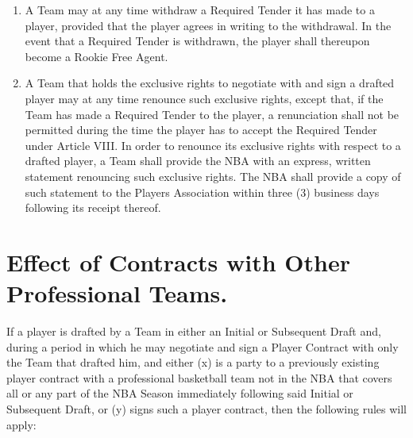 \documentclass[
]{book}
\begin{document}
\begin{enumerate}
\item
  A Team may at any time withdraw a Required Tender it has made to a player, provided that the player agrees in writing to the withdrawal. In the event that a Required Tender is withdrawn, the player shall thereupon become a Rookie Free Agent.
\item
  A Team that holds the exclusive rights to negotiate with and sign a drafted player may at any time renounce such exclusive rights, except that, if the Team has made a Required Tender to the player, a renunciation shall not be permitted during the time the player has to accept the Required Tender under Article VIII. In order to renounce its exclusive rights with respect to a drafted player, a Team shall provide the NBA with an express, written statement renouncing such exclusive rights. The NBA shall provide a copy of such statement to the Players Association within three (3) business days following its receipt thereof.
\end{enumerate}

\hypertarget{effect-of-contracts-with-other-professional-teams.}{%
\section{Effect of Contracts with Other Professional Teams.}\label{effect-of-contracts-with-other-professional-teams.}}

If a player is drafted by a Team in either an Initial or Subsequent Draft and, during a period in which he may negotiate and sign a Player Contract with only the Team that drafted him, and either (x) is a party to a previously existing player contract with a professional basketball team not in the NBA that covers all or any part of the NBA Season immediately following said Initial or Subsequent Draft, or (y) signs such a player contract, then the following rules will apply:
\end{document}
